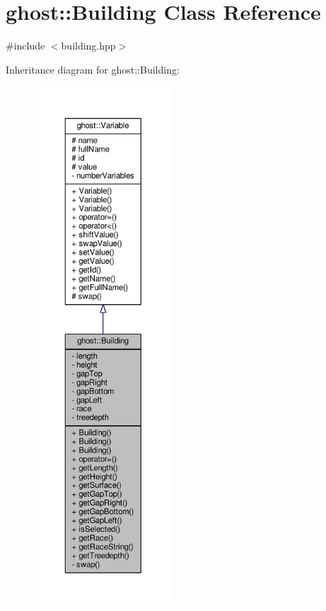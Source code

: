 \hypertarget{classghost_1_1Building}{\section{ghost\-:\-:Building Class Reference}
\label{classghost_1_1Building}
}


{\ttfamily \#include $<$building.\-hpp$>$}



Inheritance diagram for ghost\-:\-:Building\-:
\nopagebreak
\begin{figure}[H]
\begin{center}
\leavevmode
\includegraphics[height=550pt]{classghost_1_1Building__inherit__graph}
\end{center}
\end{figure}


